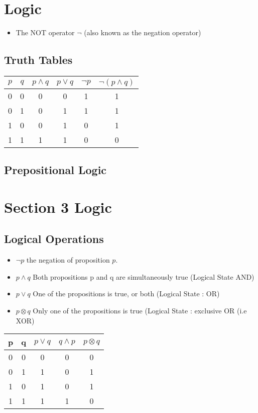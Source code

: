\documentclass[12pt]{article}
\begin{document}

\section{Logic}
\begin{itemize}
	\item The NOT operator $\neg$ (also known as the negation operator)
\end{itemize}
\subsection{Truth Tables}
{
	\begin{center}
		\begin{tabular}{|c|c||c|c||c|c|}
			\hline $p$ & $q$ & $p \wedge q$ & $p\vee q$ & $\neg p$  & $\neg (p \wedge q)$ \\ 
			\hline 0 & 0 & 0 & 0 & 1 & 1 \\ 
			\hline 0 & 1 & 0 & 1 & 1 & 1 \\ 
			\hline 1 & 0 & 0 & 1 & 0 & 1 \\ 
			\hline 1 & 1 & 1 & 1 & 0 & 0 \\ 
			\hline 
		\end{tabular} 
	\end{center}
}

\subsection*{Prepositional Logic}

\section{Section 3 Logic}
\subsection{Logical Operations}
\begin{itemize}
\item $\neg p$ the negation of proposition $p$.
\item $p \wedge q$ Both propositions p and q are simultaneously true (Logical State AND)
\item $p \vee q $ One of the propositions is true, or both (Logical State : OR)
\item $p \otimes q$ Only one of the propositions is true (Logical State : exclusive OR (i.e XOR)
\end{itemize}
\begin{center}
\begin{tabular}{|c|c|c|c|c|}
\hline
p & q & $p \vee q$ & $q \wedge p$ & $p \otimes q$ \\
\hline
0 & 0 & 0 & 0 & 0 \\
0 & 1 & 1 & 0 & 1\\
1 & 0 & 1 & 0 & 1 \\
1 & 1 & 1 & 1 & 0\\
\hline
\end{tabular}
\end{center}
\end{document}
